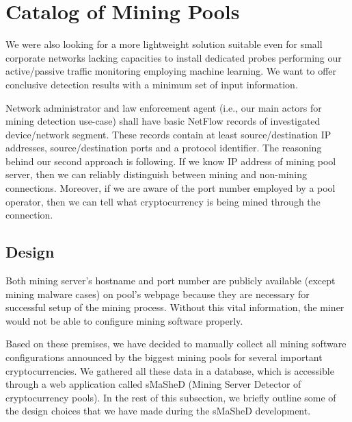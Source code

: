 \documentclass[preprint,12pt,3p]{elsarticle}
\begin{document}

\section{Catalog of Mining Pools}
\label{sec5}
We were also looking for a more lightweight solution suitable even for small corporate networks lacking capacities to install dedicated probes performing our active/passive traffic monitoring employing machine learning. We want to offer conclusive detection results with a minimum set of input information. 

Network administrator and law enforcement agent (i.e., our main actors for mining detection use-case) shall have basic NetFlow records of investigated device/network segment. These records contain at least source/destination IP addresses, source/destination ports and a protocol identifier. The reasoning behind our second approach is following. If we know IP address of mining pool server, then we can reliably distinguish between mining and non-mining connections. Moreover, if we are aware of the port number employed by a pool operator, then we can tell what cryptocurrency is being mined through the connection. 

\subsection{Design}
\label{subsec51}
Both mining server's hostname and port number are publicly available (except mining malware cases) on pool's webpage because they are necessary for successful setup of the mining process. Without this vital information, the miner would not be able to configure mining software properly.

Based on these premises, we have decided to manually collect all mining software configurations announced by the biggest mining pools for several important cryptocurrencies. We gathered all these data in a database, which is accessible through a web application called sMaSheD (Mining Server Detector of cryptocurrency pools). In the rest of this subsection, we briefly outline some of the design choices that we have made during the sMaSheD development.
\end{document}
